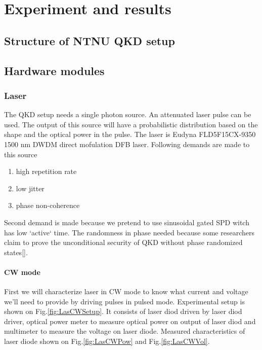 \chapter{Experiment and results}

\section{Structure of NTNU QKD setup}

\section{Hardware modules}


\subsection{Laser}

The QKD setup needs a single photon source. An attenuated laser pulse
can be used. The output of this source will have a probabilistic
distribution based on the shape and the optical power in the
pulse. The laser is Eudyna FLD5F15CX-9350 1500 nm DWDM direct
mofulation DFB laser.  Following demands are made to this source
\begin{enumerate}
\item high repetition rate
\item low jitter
\item phase non-coherence
\end{enumerate}
Second demand is made because we pretend to use sinusoidal gated SPD
witch has low `active` time.  The randomness in phase needed because
some researchers claim to prove the unconditional security of QKD without
phase randomized states[].

\subsubsection{CW mode}

First we will characterize laser in CW mode to know what current and
voltage we'll need to provide by driving pulses in pulsed
mode. Experimental setup is shown on Fig.\ref{fig:LasCWSetup}. It consists of
laser diod driven by laser diod driver, optical power meter to measure
optical power on output of laser diod and multimeter to measure the
voltage on laser diode. Measured characteristics of laser diode shown 
on Fig.\ref{fig:LasCWPow} and Fig.\ref{fig:LasCWVol}.

